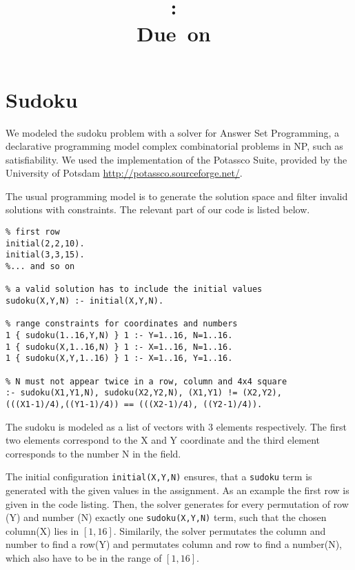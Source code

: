 \documentclass{article}
\title{
\vspace{2in}
\textmd{\textbf{\hmwkClass:\ \hmwkTitle}}\\
\normalsize\vspace{0.1in}\small{Due\ on\ \hmwkDueDate}\\
\vspace{0.1in}\large{\textit{\hmwkClassInstructor}}
\vspace{3in}
}
\author{\textbf{\hmwkAuthorName}}
\date{} %
\begin{document}
\maketitle


\newpage


\section{Sudoku}

We modeled the sudoku problem with a solver for Answer Set Programming, a declarative programming model complex combinatorial problems in NP, such as satisfiability.
We used the implementation of the Potassco Suite, provided by the University of Potsdam \url{http://potassco.sourceforge.net/}.

The usual programming model is to generate the solution space and filter invalid solutions with constraints.
The relevant part of our code is listed below.

\begin{verbatim}
% first row
initial(2,2,10).
initial(3,3,15).
%... and so on

% a valid solution has to include the initial values
sudoku(X,Y,N) :- initial(X,Y,N).

% range constraints for coordinates and numbers
1 { sudoku(1..16,Y,N) } 1 :- Y=1..16, N=1..16.
1 { sudoku(X,1..16,N) } 1 :- X=1..16, N=1..16.
1 { sudoku(X,Y,1..16) } 1 :- X=1..16, Y=1..16.

% N must not appear twice in a row, column and 4x4 square
:- sudoku(X1,Y1,N), sudoku(X2,Y2,N), (X1,Y1) != (X2,Y2),
(((X1-1)/4),((Y1-1)/4)) == (((X2-1)/4), ((Y2-1)/4)).

\end{verbatim}

The sudoku is modeled as a list of vectors with 3 elements respectively.
The first two elements correspond to the X and Y coordinate and the third element corresponds to the number N in the field.

The initial configuration \texttt{initial(X,Y,N)} ensures, that a \texttt{sudoku} term is generated with the given values in the assignment. As an example the first row is given in the code listing.
Then, the solver generates for every permutation of row (Y) and number (N) exactly one \texttt{sudoku(X,Y,N)} term, such that the chosen column(X) lies in $[1, 16]$.
Similarily, the solver permutates the column and number to find a row(Y) and permutates column and row to find a number(N), which also have to be in the range of $[1, 16]$.
\end{document}
